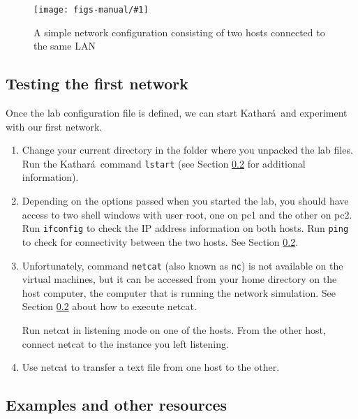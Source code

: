 \documentclass[12pt]{book}
\newcommand{\kathara}{Kathar\'a}
\newcommand{\insfig}[3]{
\begin{figure}[tb]
\begin{center}
\texttt{[image: figs-manual/\#1]}
\caption{#3\label{#1.fig}}
\end{center}
\end{figure}
}
\begin{document}
\insfig{2nodes}{.5}{A simple network configuration consisting of two
  hosts connected to the same LAN}


\subsection{Testing the first network}

Once the lab configuration file is defined, we can start \kathara\ and
experiment with our first network.

\begin{enumerate}[(1)]
\item Change your current directory in the folder where you unpacked
  the lab files. Run the \kathara\ command
  \verb$lstart$ (see Section \ref{examples.lab0} for additional
    information).

  \item Depending on the options passed when you started the lab, you
    should have access to two shell windows with user root, one on pc1
    and the other on pc2. Run \verb$ifconfig$ to check the IP address
    information on both hosts. Run \verb$ping$ to check for
    connectivity between the two hosts. See Section
    \ref{examples.lab0}.

  \item Unfortunately, command \verb$netcat$ (also known as \verb$nc$)
    is not available on the virtual machines, but it can be accessed
    from your home directory on the host computer, the computer that
    is running the network simulation. See Section \ref{examples.lab0}
    about how to execute netcat.

    Run netcat in listening mode on one of the hosts. From the other
    host, connect netcat to the instance you left listening.

  \item Use netcat to transfer a text file from one host to the
    other. 
\end{enumerate}



\subsection{Examples and other resources}\label{examples.lab0}
\end{document}
